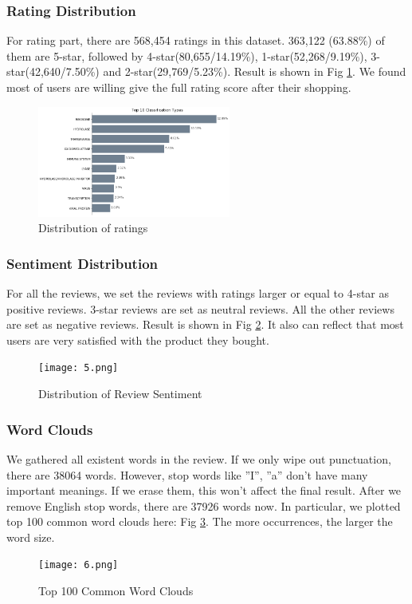 \documentclass[sigconf]{acmart}
\begin{document}
\subsubsection{Rating Distribution}
For rating part, there are 568,454 ratings in this dataset. 363,122 (63.88\%) of them are 5-star, followed by 4-star(80,655/14.19\%), 1-star(52,268/9.19\%), 3-star(42,640/7.50\%) and 2-star(29,769/5.23\%). Result is shown in Fig \ref{2}. We found most of users are willing give the full rating score after their shopping.
\begin{figure}
  \centering
  \includegraphics [width=2.5in]{3.png}
  \caption{Distribution of ratings}
  \label{2}
\end{figure}

\subsubsection{Sentiment Distribution}
For all the reviews, we set the reviews with ratings larger or equal to 4-star as positive reviews. 3-star reviews are set as neutral reviews.  All the other reviews are set as negative reviews. Result is shown in Fig \ref{3}. It also can reflect that most users are very satisfied with the product they bought.
\begin{figure}
  \centering
  \texttt{[image: 5.png]}
  \caption{Distribution of Review Sentiment}
  \label{3}
\end{figure}

\subsubsection{Word Clouds}
We gathered all existent words in the review. If we only wipe out punctuation, there are 38064 words. However, stop words like ”I”, ”a” don’t have many important meanings. If we erase them, this won’t affect the final result. After we remove English stop words, there are 37926 words now. In particular, we plotted top 100 common word clouds here: Fig \ref{4}. The more occurrences, the larger the word size.
\begin{figure}
  \centering
  \texttt{[image: 6.png]}
  \caption{Top 100 Common Word Clouds}
  \label{4}
\end{figure}
\end{document}
